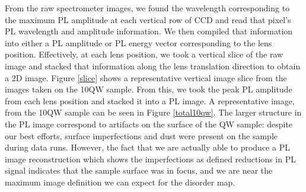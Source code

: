 \indent From the raw spectrometer images, we found the wavelength corresponding to the maximum PL amplitude at each vertical row of CCD and read that pixel's PL wavelength and amplitude information. We then compiled that information into either a PL amplitude or PL energy vector corresponding to the lens position. Effectively, at each lens position, we took a vertical slice of the raw image and stacked that information along the lens translation direction to obtain a 2D image. Figure \ref{slice} shows a representative vertical image slice from the images taken on the 10QW sample. From this, we took the peak PL amplitude from each lens position and stacked it into a PL image. A representative image, from the 10QW sample can be seen in Figure \ref{total10qw}. The larger structure in the PL image correspond to artifacts on the surface of the QW sample: despite our best efforts, surface imperfections and dust were present on the sample during data runs. However, the fact that we are actually able to produce a PL image reconstruction which shows the imperfections as defined reductions in PL signal indicates that the sample surface was in focus, and we are near the maximum image definition we can expect for the disorder map. 

